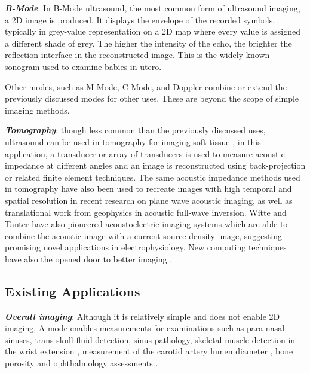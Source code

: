 \documentclass{article}
\begin{document}
\textbf{\textit{B-Mode}}: In B-Mode ultrasound, the most common form of ultrasound imaging, a 2D image is produced. It displays the envelope of the recorded symbols, typically in grey-value representation on a 2D map where every value is assigned a different shade of grey. The higher the intensity of the echo, the brighter the reflection interface in the reconstructed image. This is the widely known sonogram used to examine babies in utero.

Other modes, such as M-Mode, C-Mode, and Doppler combine or extend the previously discussed modes for other uses. These are beyond the scope of simple imaging methods.

\textbf{\textit{Tomography}}: though less common than the previously discussed uses, ultrasound can be used in tomography for imaging soft tissue \cite{zhang_design_2015, duric_detection_2007, wen_design_2019, ashfaq_new_2004}, in this application, a transducer or array of transducers is used to measure acoustic impedance at different angles and an image is reconstructed using back-projection or related finite element techniques. The same acoustic impedance methods used in tomography have also been used to recreate images with high temporal and spatial resolution in recent research on plane wave acoustic imaging\cite{Rabut2019}, as well as translational work from geophysics in acoustic full-wave inversion\cite{Warner2013}. Witte and Tanter have also pioneered acoustoelectric imaging systems which are able to combine the acoustic image with a current-source density image, suggesting promising novel applications in electrophysiology\cite{Xi2009, Qin2017}. New computing techniques have also the opened door to better imaging \cite{guasch_full-waveform_2020, rymarczyk_logistic_2019}. 


\subsection{Existing Applications}

\textbf{\textit{Overall imaging}}: Although it is relatively simple and does not enable 2D imaging, A-mode enables 
measurements for examinations such as para-nasal sinuses, trans-skull fluid detection, sinus pathology, skeletal muscle detection in the wrist extension \cite{noauthor_wrist_nodate}, measurement of the carotid artery lumen diameter \cite{hu_design_2011, zhang_multi-channel_2017, shomaji_early_2019}, bone porosity \cite{wahab_design_2016, fontes-pereira_monitoring_2018, grasel_characterization_2017} and ophthalmology assessments \cite{carotenuto_very_2004}.
\end{document}
